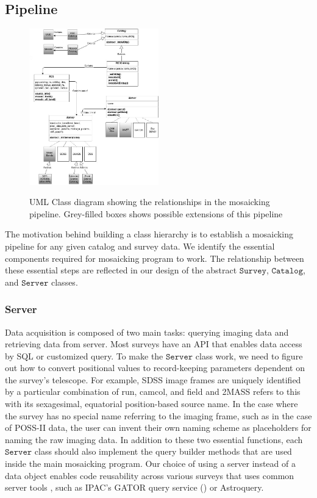 \documentclass[authoryear, 12pt,5p, times]{elsarticle}
\begin{document}
	\subsection{Pipeline}
	\begin{figure}[h]
		\includegraphics[width=0.5\textwidth]{figures/hierarchy}
		\label{fig:hierarchy}
		\caption{UML Class diagram showing the relationships in the mosaicking pipeline. Grey-filled boxes shows possible extensions of this pipeline}
	\end{figure}
 	The motivation behind building a class hierarchy is to establish a mosaicking pipeline for any given catalog and survey data. We identify the essential components required for mosaicking program to work. The relationship between these essential steps are reflected in our design of the abstract $\texttt{Survey}$, $\texttt{Catalog}$, and $\texttt{Server}$ classes. 
 		\subsubsection{Server}
		Data acquisition is composed of two main tasks: querying imaging data and retrieving data from server. Most surveys have an API that enables data access by SQL or customized query. To make the $\texttt{Server}$ class work, we need to figure out how to convert positional values to record-keeping parameters dependent on the survey's telescope. For example, SDSS image frames are uniquely identified by a particular combination of  run, camcol, and field and 2MASS refers to this with its sexagesimal, equatorial position-based source name. In the case where the survey has no special name referring to the imaging frame, such as in the case of POSS-II data, the user can invent their own naming scheme as placeholders for naming the raw imaging data. In addition to these two essential functions, each $\texttt{Server}$ class should also implement the query builder methods that are used inside the main mosaicking program.  Our choice of using a server instead of a data object enables code reusability across various surveys that uses common server tools , such as IPAC's GATOR query service (\citealp{irsa}) or  Astroquery.
\end{document}

